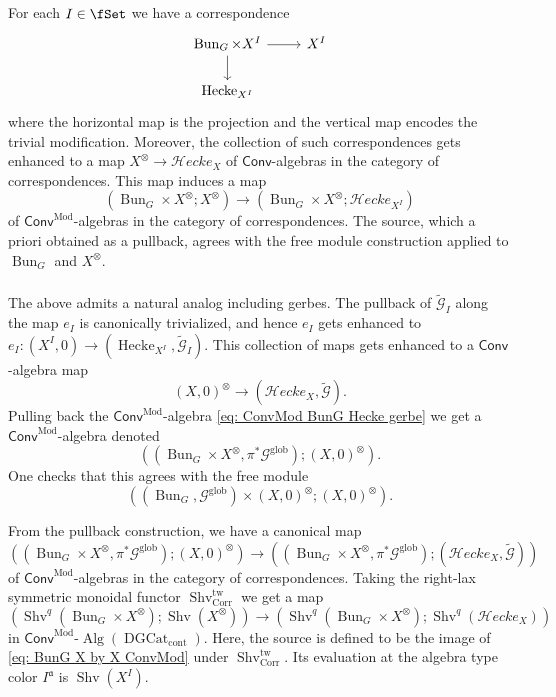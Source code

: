 \documentclass[10pt]{amsart}
\newcommand{\sssec}{\subsubsection}
\theoremstyle{remark}
\newcommand{\mf}[1]{\mathfrak{#1}}
\newcommand{\wt}{\widetilde}
\newcommand{\on}{\operatorname}
\newcommand{\cG}{\mathcal{G}}
\newcommand{\DGcat}{\on{DGCat}_{\on{cont}}}
\newcommand{\lAlg}{\text{-}\on{Alg}}
\newcommand{\Shv}{\on{Shv}}
\newcommand{\Hecke}{\on{Hecke}}
\newcommand{\Bun}{\on{Bun}}
\newcommand{\Conv}{\mathsf{Conv}}
\newcommand{\ConvMod}{\mathsf{Conv}^{\on{Mod}}}
\newcommand{\cHecke}{\mathcal{H}ecke}
\newcommand{\Corr}{\on{Corr}}
\begin{document}
For each $I\in\fSet$ we have a correspondence
\[\begin{tikzcd}
	{\Bun_G\times X^I} & {X^I} \\
	{\Hecke_{X^I}}
	\arrow[from=1-1, to=1-2]
	\arrow[from=1-1, to=2-1]
\end{tikzcd}\]
where the horizontal map is the projection and the vertical map encodes the trivial modification. Moreover, the collection of such correspondences gets enhanced to a map $X^{\otimes}\rightarrow \cHecke_{X}$ of $\Conv$-algebras in the category of correspondences. This map induces a map
\[(\Bun_G\times X^{\otimes}; X^{\otimes})\rightarrow (\Bun_G\times X^{\otimes}; \cHecke_{X^I})\]
of $\ConvMod$-algebras in the category of correspondences. The source, which a priori obtained as a pullback, agrees with the free module construction applied to $\Bun_G$ and $X^{\otimes}$.

\sssec{}\label{sssec: unit canonical pointing gerbe}
The above admits a natural analog including gerbes. The pullback of $\wt{\cG}_I$ along the map $e_I$ is canonically trivialized, and hence $e_I$ gets enhanced to
$e_I: (X^I,0)\rightarrow (\Hecke_{X^I},\wt{\cG}_I)$.
This collection of maps gets enhanced to a $\Conv$-algebra map 
\begin{equation}\label{eq: can pointing cHecke gerbe}
    (X,0)^{\otimes}\rightarrow (\cHecke_{X},\wt{\cG}).
\end{equation}
Pulling back the $\ConvMod$-algebra \eqref{eq: ConvMod BunG Hecke gerbe} we get a $\ConvMod$-algebra denoted \begin{equation}\label{eq: BunG X by X ConvMod}
    ((\Bun_G\times X^{\otimes}, \pi^*\cG^{\on{glob}}); (X,0)^{\otimes}).
\end{equation}
One checks that this agrees with the free module
\[((\Bun_G,\cG^{\on{glob}})\times (X,0)^{\otimes}; (X,0)^{\otimes}).\]

From the pullback construction, we have a canonical map
\[((\Bun_G\times X^{\otimes},\pi^*\cG^{\on{glob}}); (X,0)^{\otimes})\rightarrow ((\Bun_G\times X^{\otimes},\pi^*\cG^{\on{glob}}); (\cHecke_X,\wt{\cG}))\]
of $\ConvMod$-algebras in the category of correspondences.  Taking the right-lax symmetric monoidal functor $\Shv^{\on{tw}}_{\Corr}$ we get a map
\begin{equation}\label{eq: pullback to the action of Shv X}
    (\Shv^q(\Bun_G\times X^{\otimes});\Shv(X^{\otimes}))\rightarrow (\Shv^q(\Bun_G\times X^{\otimes}); \Shv^q(\cHecke_X))
\end{equation}
in $\ConvMod\lAlg(\DGcat)$. Here, the source is defined to be the image of \eqref{eq: BunG X by X ConvMod} under $\Shv^{\on{tw}}_{\Corr}$. Its evaluation at the algebra type color $I^{\mf{a}}$ is $\Shv(X^I)$.
\end{document}
